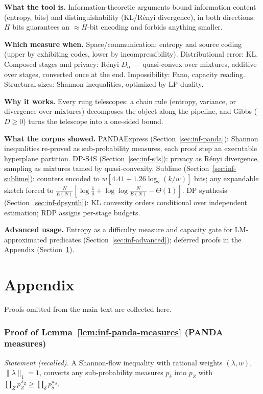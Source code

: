 \begin{recap}
\item \textbf{What the tool is.} Information-theoretic arguments bound information
  content (entropy, bits) and distinguishability (KL/R\'enyi divergence), in both
  directions: $H$ bits guarantees an $\approx H$-bit encoding and forbids anything
  smaller.
\item \textbf{Which measure when.} Space/communication: entropy and source coding
  (upper by exhibiting codes, lower by incompressibility). Distributional error: KL.
  Composed stages and privacy: R\'enyi $D_\alpha$ --- quasi-convex over mixtures,
  additive over stages, converted once at the end. Impossibility: Fano, capacity
  reading. Structural sizes: Shannon inequalities, optimized by LP duality.
\item \textbf{Why it works.} Every rung telescopes: a chain rule (entropy, variance,
  or divergence over mixtures) decomposes the object along the pipeline, and Gibbs
  ($D \ge 0$) turns the telescope into a one-sided bound.
\item \textbf{What the corpus showed.} PANDAExpress (Section~\ref{sec:inf-panda}):
  Shannon inequalities re-proved as sub-probability measures, each proof step an
  executable hyperplane partition. DP-S4S (Section~\ref{sec:inf-s4s}): privacy as
  R\'enyi divergence, sampling as mixtures tamed by quasi-convexity. Sublime
  (Section~\ref{sec:inf-sublime}): counters encoded to $w[4.41 + 1.26\log_2(k/w)]$
  bits; any expandable sketch forced to
  $\frac{N}{E(N)}[\log\frac1\delta + \log\log\frac{N}{E(N)} - \Theta(1)]$. DP
  synthesis (Section~\ref{sec:inf-dpsynth}): KL convexity orders conditional over
  independent estimation; RDP assigns per-stage budgets.
\item \textbf{Advanced usage.} Entropy as a difficulty measure and capacity gate for
  LM-approximated predicates (Section~\ref{sec:inf-advanced}); deferred proofs in the
  Appendix (Section~\ref{sec:inf-appendix}).
\end{recap}

\section{Appendix}
\label{sec:inf-appendix}

Proofs omitted from the main text are collected here.

\subsubsection*{Proof of Lemma~\ref{lem:inf-panda-measures} (PANDA measures)}
{\itshape Statement (recalled).} A Shannon-flow inequality with rational weights
$(\lambda, w)$, $\|\lambda\|_1 = 1$, converts any sub-probability measures $p_\delta$
into $p_Z$ with $\prod_Z p_Z^{\lambda_Z} \ge \prod_\delta p_\delta^{w_\delta}$.\eop

